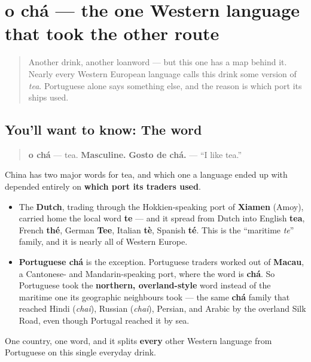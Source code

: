 \section[o chá]{o chá — the one Western language that took the other route}

\label{lesson:PT-C23-cha}



\begin{quote}
Another drink, another loanword — but this one has a map behind it. Nearly every Western European language calls this drink some version of \emph{tea}. Portuguese alone says something else, and the reason is which port its ships used.
\end{quote}

\subsection*{You'll want to know: The word}
\begin{quote}
\textbf{o chá} — tea. \textbf{Masculine.} \textbf{Gosto de chá.} — \textquotedblleft{}I like tea.\textquotedblright{}
\end{quote}

\begin{cousinweb}
China has two major words for tea, and which one a language ended up with depended entirely on \textbf{which port its traders used}.

\begin{itemize}
\raggedright
  \item The \textbf{Dutch}, trading through the Hokkien-speaking port of \textbf{Xiamen} (Amoy), carried home the local word \textbf{te} — and it spread from Dutch into English \textbf{tea}, French \textbf{thé}, German \textbf{Tee}, Italian \textbf{tè}, Spanish \textbf{té}. This is the \textquotedblleft{}maritime \emph{te}\textquotedblright{} family, and it is nearly all of Western Europe.
  \item \textbf{Portuguese chá} is the exception. Portuguese traders worked out of \textbf{Macau}, a Cantonese- and Mandarin-speaking port, where the word is \textbf{chá}. So Portuguese took the \textbf{northern, overland-style} word instead of the maritime one its geographic neighbours took — the same \textbf{chá} family that reached Hindi (\emph{chai}), Russian (\emph{chai}), Persian, and Arabic by the overland Silk Road, even though Portugal reached it by sea.
\end{itemize}

One country, one word, and it splits \textbf{every} other Western language from Portuguese on this single everyday drink.
\end{cousinweb}

